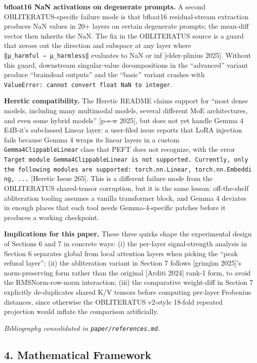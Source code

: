 \documentclass[
  11pt,
]{article}
\begin{document}
\textbf{bfloat16 NaN activations on degenerate prompts.} A second
OBLITERATUS-specific failure mode is that bfloat16 residual-stream
extraction produces NaN values in 20+ layers on certain degenerate
prompts; the mean-diff vector then inherits the NaN. The fix in the
OBLITERATUS source is a guard that zeroes out the direction and subspace
at any layer where \texttt{‖μ\_harmful\ −\ μ\_harmless‖} evaluates to
NaN or inf {[}elder-plinius 2025{]}. Without this guard, downstream
singular-value decompositions in the ``advanced'' variant produce
``braindead outputs'' and the ``basic'' variant crashes with
\texttt{ValueError:\ cannot\ convert\ float\ NaN\ to\ integer}.

\textbf{Heretic compatibility.} The Heretic README claims support for
``most dense models, including many multimodal models, several different
MoE architectures, and even some hybrid models'' {[}p-e-w 2025{]}, but
does not yet handle Gemma 4 E4B-it's subclassed Linear layer: a
user-filed issue reports that LoRA injection fails because Gemma 4 wraps
its linear layers in a custom \texttt{Gemma4ClippableLinear} class that
PEFT does not recognize, with the error
\texttt{Target\ module\ Gemma4ClippableLinear\ is\ not\ supported.\ Currently,\ only\ the\ following\ modules\ are\ supported:\ torch.nn.Linear,\ torch.nn.Embedding,\ ...}
{[}Heretic Issue 265{]}. This is a different failure mode from the
OBLITERATUS shared-tensor corruption, but it is the same lesson:
off-the-shelf abliteration tooling assumes a vanilla transformer block,
and Gemma 4 deviates in enough places that each tool needs
Gemma-4-specific patches before it produces a working checkpoint.

\textbf{Implications for this paper.} These three quirks shape the
experimental design of Sections 6 and 7 in concrete ways: (i) the
per-layer signal-strength analysis in Section 6 separates global from
local attention layers when picking the ``peak refusal layer''; (ii) the
abliteration variant in Section 7 follows {[}grimjim 2025{]}'s
norm-preserving form rather than the original {[}Arditi 2024{]} rank-1
form, to avoid the RMSNorm-row-norm interaction; (iii) the comparative
weight-diff in Section 7 explicitly de-duplicates shared K/V tensors
before computing per-layer Frobenius distances, since otherwise the
OBLITERATUS v2-style 18-fold repeated projection would inflate the
comparison artificially.

\emph{Bibliography consolidated in \texttt{paper/references.md}.}

\subsection{4. Mathematical Framework}\label{mathematical-framework}
\end{document}
